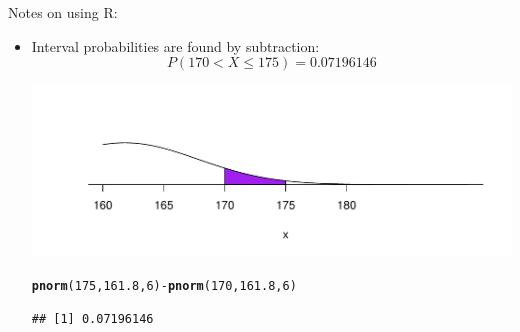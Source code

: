 \documentclass[t,xcolor=pdftex,dvipsnames,table]{beamer}\usepackage[]{graphicx}\usepackage[]{color}
\makeatletter
\def\maxwidth{ %
  \ifdim\Gin@nat@width>\linewidth
    \linewidth
  \else
    \Gin@nat@width
  \fi
}
\newcommand{\hlnum}[1]{\textcolor[rgb]{0.686,0.059,0.569}{#1}}%
\newcommand{\hlopt}[1]{\textcolor[rgb]{0,0,0}{#1}}%
\newcommand{\hlstd}[1]{\textcolor[rgb]{0.345,0.345,0.345}{#1}}%
\newcommand{\hlkwd}[1]{\textcolor[rgb]{0.737,0.353,0.396}{\textbf{#1}}}%
\newenvironment{kframe}{%
 \def\at@end@of@kframe{}%
 \ifinner\ifhmode%
  \def\at@end@of@kframe{\end{minipage}}%
  \begin{minipage}{\columnwidth}%
 \fi\fi%
 \def\FrameCommand##1{\hskip\@totalleftmargin \hskip-\fboxsep
 \colorbox{shadecolor}{##1}\hskip-\fboxsep
     \hskip-\linewidth \hskip-\@totalleftmargin \hskip\columnwidth}%
 \MakeFramed {\advance\hsize-\width
   \@totalleftmargin\z@ \linewidth\hsize
   \@setminipage}}%
 {\par\unskip\endMakeFramed%
 \at@end@of@kframe}
\newenvironment{knitrout}{}{} %
\makeatother
\begin{document}
\begin{frame}[fragile]
Notes on using R:
\begin{itemize}
\item
Interval probabilities are found by subtraction:
\[ P( 170 < X \leq 175) = 0.07196146 \]

\begin{knitrout}
\color{fgcolor}
\includegraphics[width=\maxwidth]{figure/unnamed-chunk-86-1} 

\end{knitrout}

\begin{knitrout}
\color{fgcolor}\begin{kframe}
\begin{alltt}
\hlkwd{pnorm}\hlstd{(}\hlnum{175}\hlstd{,}\hlnum{161.8}\hlstd{,}\hlnum{6}\hlstd{)}\hlopt{-}\hlkwd{pnorm}\hlstd{(}\hlnum{170}\hlstd{,}\hlnum{161.8}\hlstd{,}\hlnum{6}\hlstd{)}
\end{alltt}
\begin{verbatim}
## [1] 0.07196146
\end{verbatim}
\end{kframe}
\end{knitrout}
\end{itemize}
\end{frame}
\end{document}
